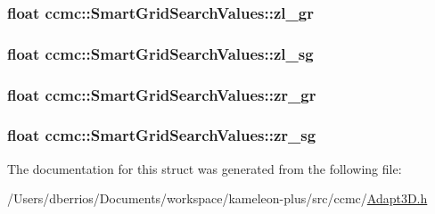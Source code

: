 \hypertarget{structccmc_1_1_smart_grid_search_values_a48282880363f71c4808e1c52b02b3f15}{
\subsubsection[{zl\-\_\-gr}]{\setlength{\rightskip}{0pt plus 5cm}float ccmc\-::\-Smart\-Grid\-Search\-Values\-::zl\-\_\-gr}}\label{structccmc_1_1_smart_grid_search_values_a48282880363f71c4808e1c52b02b3f15}
\hypertarget{structccmc_1_1_smart_grid_search_values_a5fb89265acfd6f65e95d71ae9ddc8a96}{
\subsubsection[{zl\-\_\-sg}]{\setlength{\rightskip}{0pt plus 5cm}float ccmc\-::\-Smart\-Grid\-Search\-Values\-::zl\-\_\-sg}}\label{structccmc_1_1_smart_grid_search_values_a5fb89265acfd6f65e95d71ae9ddc8a96}
\hypertarget{structccmc_1_1_smart_grid_search_values_a8b574711e03c10b054ce85b65123349b}{
\subsubsection[{zr\-\_\-gr}]{\setlength{\rightskip}{0pt plus 5cm}float ccmc\-::\-Smart\-Grid\-Search\-Values\-::zr\-\_\-gr}}\label{structccmc_1_1_smart_grid_search_values_a8b574711e03c10b054ce85b65123349b}
\hypertarget{structccmc_1_1_smart_grid_search_values_aafc8fc1c1fbadae14f2a921f14853189}{
\subsubsection[{zr\-\_\-sg}]{\setlength{\rightskip}{0pt plus 5cm}float ccmc\-::\-Smart\-Grid\-Search\-Values\-::zr\-\_\-sg}}\label{structccmc_1_1_smart_grid_search_values_aafc8fc1c1fbadae14f2a921f14853189}


The documentation for this struct was generated from the following file\-:\begin{DoxyCompactItemize}
\item 
/\-Users/dberrios/\-Documents/workspace/kameleon-\/plus/src/ccmc/\hyperlink{_adapt3_d_8h}{Adapt3\-D.\-h}\end{DoxyCompactItemize}
